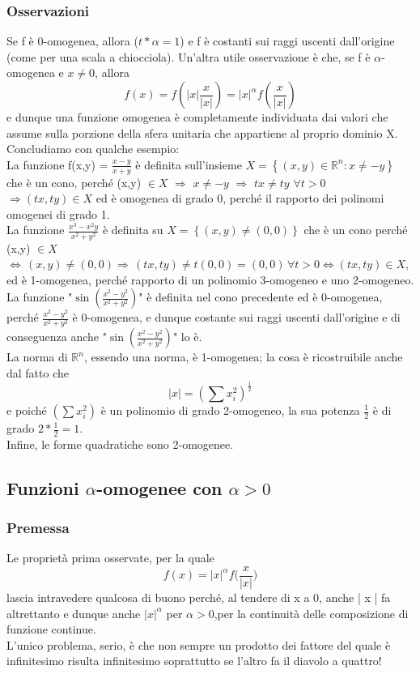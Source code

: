 \documentclass[fontsize = 20px, paper = a4]{article}
\begin{document}
\subsubsection{Osservazioni}
Se f è 0-omogenea, allora ($t*\alpha = 1$) e f è costanti sui raggi uscenti dall'origine (come per una scala a chiocciola). Un'altra utile osservazione è che, se f è $\alpha$-omogenea e $x \neq 0$, allora
$$f(x) = f\left(| x | \frac{x}{| x |}\right) = | x |^\alpha f\left(\frac{x}{| x |}\right)$$
e dunque una funzione omogenea è completamente individuata dai valori che assume sulla porzione della sfera unitaria che appartiene al proprio dominio X.\\
Concludiamo con qualche esempio:\\
La funzione f(x,y) = $\frac{x - y}{x + y}$ è definita sull'insieme $X = \left\{ (x,y) \in \mathbb{R}^n : x\neq -y \right\}$ che è un cono, perché (x,y) $\in X $ $\Rightarrow$  $x \neq -y$ $\Rightarrow$ $tx \neq ty$ $\forall t > 0$  $\Rightarrow(tx,ty) \in X$ ed è omogenea di grado 0, perché il rapporto dei polinomi omogenei di grado 1. \\
La funzione $\frac{x^3 - x^2y}{x^2 + y^2}$ è definita su $X = \left \{(x,y) \neq ( 0,0 ) \right \}$ che è un cono perché (x,y) $\in X$ $\Leftrightarrow \, (x,y) \neq (0,0) \Rightarrow \, (tx,ty) \neq t(0,0) = (0,0) \, \forall t > 0 \Leftrightarrow (tx,ty) \in X$, ed è 1-omogenea, perché rapporto di un polinomio 3-omogeneo e uno 2-omogeneo.\\
La funzione "$\sin \left ( \frac{x^2 - y^ 2}{x^2 + y^2} \right )$" è definita  nel cono precedente ed è 0-omogenea, perché $\frac{x^2 - y^2}{x^2 + y^2}$ è 0-omogenea, e dunque costante sui raggi uscenti dall'origine e di conseguenza anche "$\sin \left ( \frac{x^2 - y^ 2}{x^2 + y^2}\right )$" lo è.\\
La norma di $\mathbb{R}^n$, essendo una norma, è 1-omogenea; la cosa è ricostruibile anche dal fatto che 
$$|x| = \left(\sum{x_{i}^2} \right )^\frac{1}{2}$$
e poiché $\left (\sum{x_{i}^2} \right )$ è un polinomio di grado 2-omogeneo, la sua potenza $\frac{1}{2}$ è di grado $2 * \frac{1}{2} = 1$. \\
Infine, le forme quadratiche sono 2-omogenee.
\subsection{Funzioni $\alpha$-omogenee con  $\alpha > 0$ }
\subsubsection{Premessa}
Le proprietà prima osservate, per la quale
$$f(x) = | x |^\alpha f\Big (\frac{x}{| x |} \Big )$$
lascia intravedere qualcosa di buono perché, al tendere di x a 0, anche | x | fa altrettanto e dunque anche $| x |^\alpha$ per $\alpha > 0$,per la continuità delle composizione di funzione continue.\\
L'unico problema, serio, è che non sempre un prodotto dei fattore del quale è infinitesimo risulta infinitesimo soprattutto se l'altro fa il diavolo a quattro!\\
\end{document}

